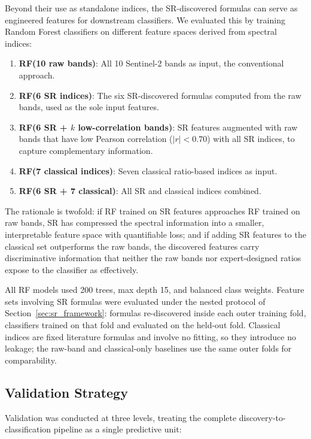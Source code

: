 \documentclass[preprint,authoryear,number]{elsarticle}
\begin{document}
Beyond their use as standalone indices, the SR-discovered formulas can serve as engineered features for downstream classifiers. We evaluated this by training Random Forest classifiers on different feature spaces derived from spectral indices:

\begin{enumerate}
  \item \textbf{RF(10 raw bands)}: All 10 Sentinel-2 bands as input, the conventional approach.
  \item \textbf{RF(6 SR indices)}: The six SR-discovered formulas computed from the raw bands, used as the sole input features.
  \item \textbf{RF(6 SR + $k$ low-correlation bands)}: SR features augmented with raw bands that have low Pearson correlation ($|r| < 0.70$) with all SR indices, to capture complementary information.
  \item \textbf{RF(7 classical indices)}: Seven classical ratio-based indices as input.
  \item \textbf{RF(6 SR + 7 classical)}: All SR and classical indices combined.
\end{enumerate}

The rationale is twofold: if RF trained on SR features approaches RF trained on raw bands, SR has compressed the spectral information into a smaller, interpretable feature space with quantifiable loss; and if adding SR features to the classical set outperforms the raw bands, the discovered features carry discriminative information that neither the raw bands nor expert-designed ratios expose to the classifier as effectively.

All RF models used 200 trees, max depth 15, and balanced class weights. Feature sets involving SR formulas were evaluated under the nested protocol of Section~\ref{sec:sr_framework}: formulas re-discovered inside each outer training fold, classifiers trained on that fold and evaluated on the held-out fold. Classical indices are fixed literature formulas and involve no fitting, so they introduce no leakage; the raw-band and classical-only baselines use the same outer folds for comparability.

\subsection{Validation Strategy}
\label{sec:validation}

Validation was conducted at three levels, treating the complete discovery-to-classification pipeline as a single predictive unit:
\end{document}
